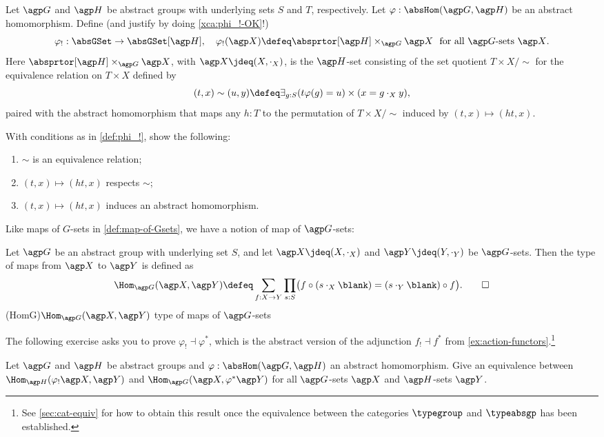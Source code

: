 \begin{definition}\label{def:phi_!}
Let $\agp G$ and $\agp H$ be abstract groups
with underlying sets $S$ and $T$, respectively.
Let $\varphi : \absHom(\agp G, \agp H)$ be an abstract homomorphism.
Define (and justify by doing \cref{xca:phi_!-OK}!)
\[
  \varphi_! : \absGSet \to \absGSet[\agp H], \quad
  \varphi_!(\agp X) \defeq \absprtor[\agp H] \times_{\agp G} {\agp X}
  \text{~~for all $\agp G$-sets $\agp X$.}
\]
Here $\absprtor[\agp H] \times_{\agp G} {\agp X}$, with
${\agp X}\jdeq(X,\cdot_X)$, is the $\agp H$-set
consisting of the set quotient $T \times X/\sim$
for the equivalence relation on $T\times X$ defined by
\[
  (t,x) \sim (u,y) \defeq 
  \exists_{g:S} (t\varphi(g) = u) \times (x = g\cdot_X y),
\]
paired with the abstract homomorphism that
maps any $h:T$ to the permutation
of $T \times X/\sim$ induced by $(t,x)\mapsto(ht,x)$.
\end{definition}

\begin{xca}\label{xca:phi_!-OK}
With conditions as in \cref{def:phi_!}, show the following:
\begin{enumerate}
\item $\sim$ is an equivalence relation;
\item $(t,x)\mapsto(ht,x)$ respects $\sim$;
\item $(t,x)\mapsto(ht,x)$ induces an abstract homomorphism.\qedhere
\end{enumerate}
\end{xca}

Like maps of $G$-sets in \cref{def:map-of-Gsets}, 
we have a notion of map of $\agp G$-sets:

\begin{definition}\label{def:Hom-absG}
  Let $\agp G$ be an abstract group with underlying set $S$, 
  and let $\agp X \jdeq (X,\cdot_X)$ and $\agp Y \jdeq (Y,\cdot_Y)$ be
  $\agp G$-sets. Then the type of maps from  $\agp X$ to $\agp Y$
  is defined as   
  \[
    \Hom_{\agp G}(\agp X,\agp Y) \defeq 
    \sum_{f:X\to Y}\prod_{s:S}
      \bigl(f\circ(s\cdot_X\blank)=(s\cdot_Y\blank)\circ f\bigr).\qedhere
  \]
  \glossary(HomG){$\protect\Hom_{\agp G}(\agp X,\agp Y)$}%
  {type of maps of $\agp G$-sets}
\end{definition}
The following exercise asks you to prove $\varphi_! \dashv \varphi^*$,
which is the abstract version of the adjunction $f_! \dashv f^*$ 
from \cref{ex:action-functors}.\footnote{See \cref{sec:cat-equiv} for how 
to obtain this result once the equivalence between the categories 
$\typegroup$ and $\typeabsgp$ has been established.}
\begin{xca}\label{xca:phi_!-|phi^*}
Let $\agp G$ and $\agp H$ be abstract groups
and $\varphi : \absHom(\agp G, \agp H)$ an abstract homomorphism.
Give an equivalence between 
$\Hom_{\agp H}(\varphi_!\agp X,\agp Y)$ and 
$\Hom_{\agp G}(\agp X,\varphi^*\agp Y)$ for all
$\agp G$-sets $\agp X$ and $\agp H$-sets $\agp Y$. 
\end{xca}

